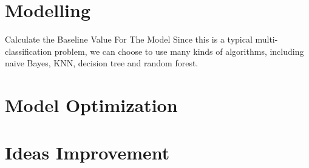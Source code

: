 \documentclass[
 size=14pt,
 paper=smartboard,  %
 mode=present, 		%
 display=slides, 	%
 style=tuliplab,  	%
 pauseslide,
 fleqn,leqno]{powerdot}
\begin{document}






\section{Modelling}


\begin{slide}{Calculate the Baseline Value For The Model}
  Since this is a typical multi-classification problem, we 
  can choose to use many kinds of algorithms, including naive
   Bayes, KNN, decision tree and random forest.
\end{slide}



\section{Model Optimization}



\section{Ideas Improvement}

\end{document}
